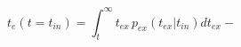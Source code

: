 \begin{equation}
t_e(t=t_{in}) =\int_t^{\infty} t_{ex}\, p_{ex}(t_{ex}|t_{in}) dt_{ex} - 
\end{equation}